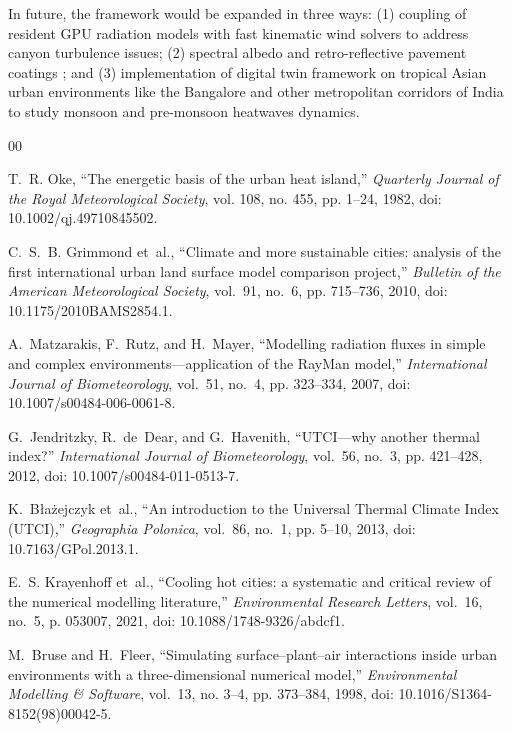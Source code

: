 \documentclass[conference]{IEEEtran}
\begin{document}
In future, the framework would be expanded in three ways: (1) coupling of resident GPU radiation models with fast kinematic wind solvers to address canyon turbulence issues; (2) spectral albedo and retro-reflective pavement coatings \cite{yuan2025harnessing}; and (3) implementation of digital twin framework on tropical Asian urban environments like the Bangalore and other metropolitan corridors of India to study monsoon and pre-monsoon heatwaves dynamics.


\begin{thebibliography}{00}

T.~R. Oke, ``The energetic basis of the urban heat island,'' \emph{Quarterly Journal of the Royal Meteorological Society}, vol. 108, no. 455, pp. 1--24, 1982, doi: 10.1002/qj.49710845502.

C.~S.~B. Grimmond et~al., ``Climate and more sustainable cities: analysis of the first international urban land surface model comparison project,'' \emph{Bulletin of the American Meteorological Society}, vol.~91, no.~6, pp. 715--736, 2010, doi: 10.1175/2010BAMS2854.1.

A.~Matzarakis, F.~Rutz, and H.~Mayer, ``Modelling radiation fluxes in simple and complex environments---application of the RayMan model,'' \emph{International Journal of Biometeorology}, vol.~51, no.~4, pp. 323--334, 2007, doi: 10.1007/s00484-006-0061-8.

G.~Jendritzky, R.~de~Dear, and G.~Havenith, ``UTCI---why another thermal index?'' \emph{International Journal of Biometeorology}, vol.~56, no.~3, pp. 421--428, 2012, doi: 10.1007/s00484-011-0513-7.

K.~B{\l}a{\.z}ejczyk et~al., ``An introduction to the Universal Thermal Climate Index (UTCI),'' \emph{Geographia Polonica}, vol.~86, no.~1, pp. 5--10, 2013, doi: 10.7163/GPol.2013.1.

E.~S. Krayenhoff et~al., ``Cooling hot cities: a systematic and critical review of the numerical modelling literature,'' \emph{Environmental Research Letters}, vol.~16, no.~5, p. 053007, 2021, doi: 10.1088/1748-9326/abdcf1.

M.~Bruse and H.~Fleer, ``Simulating surface--plant--air interactions inside urban environments with a three-dimensional numerical model,'' \emph{Environmental Modelling \& Software}, vol.~13, no. 3--4, pp. 373--384, 1998, doi: 10.1016/S1364-8152(98)00042-5.


\end{thebibliography}
\end{document}
